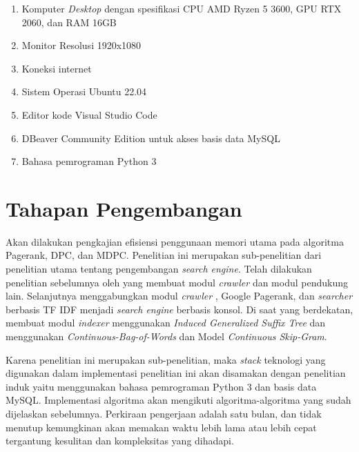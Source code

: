 \begin{enumerate}
	\item Komputer \textit{Desktop} dengan spesifikasi CPU AMD Ryzen 5 3600, GPU RTX 2060, dan RAM 16GB
	\item Monitor Resolusi 1920x1080
	\item Koneksi internet
	\item Sistem Operasi Ubuntu 22.04
	\item Editor kode Visual Studio Code
	\item DBeaver Community Edition untuk akses basis data MySQL
	\item Bahasa pemrograman Python 3
\end{enumerate}

\section{Tahapan Pengembangan}

Akan dilakukan pengkajian efisiensi penggunaan memori utama pada algoritma Pagerank, DPC, dan MDPC. Penelitian ini merupakan sub-penelitian dari penelitian utama tentang pengembangan \textit{search engine}. Telah dilakukan penelitian sebelumnya oleh \citet{qoriiba2021perancangan} yang membuat modul \textit{crawler} dan modul pendukung lain. Selanjutnya \citet{khatulistiwa2022SearchEngine} menggabungkan modul \textit{crawler} \citet{qoriiba2021perancangan}, Google Pagerank, dan \textit{searcher} berbasis TF IDF menjadi \textit{search engine} berbasis konsol. Di saat yang berdekatan, \citet{pratama2022indexer} membuat modul \textit{indexer} menggunakan \textit{Induced Generalized Suffix Tree} dan \citet{zalghornain2022indexer} menggunakan \textit{Continuous-Bag-of-Words} dan Model \textit{Continuous Skip-Gram}. 

Karena penelitian ini merupakan sub-penelitian, maka \textit{stack} teknologi yang digunakan dalam implementasi penelitian ini akan disamakan dengan penelitian induk yaitu menggunakan bahasa pemrograman Python 3 dan basis data MySQL. Implementasi algoritma akan mengikuti algoritma-algoritma yang sudah dijelaskan sebelumnya. Perkiraan pengerjaan adalah satu bulan, dan tidak menutup kemungkinan akan memakan waktu lebih lama atau lebih cepat tergantung kesulitan dan kompleksitas yang dihadapi.

